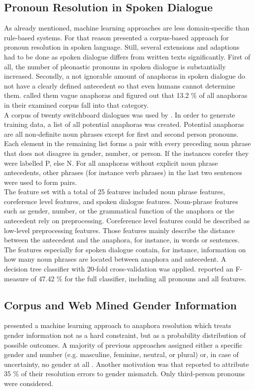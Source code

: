 \subsection{Pronoun Resolution in Spoken Dialogue}
As already mentioned, machine learning approaches are less domain-specific than rule-based systems. For that reason \cite{strube2003machine} presented a corpus-based approach for pronoun resolution in spoken language. Still, several extensions and adaptions had to be done as spoken dialogue differs from written texts significantly. First of all, the number of pleonastic pronouns in spoken dialogue is substantially increased. Secondly, a not ignorable amount of anaphoras in spoken dialogue do not have a clearly defined antecedent so that even humans cannot determine them. \cite{eckert2000dialogue} called them vague anaphoras and figured out that 13.2 \% of all anaphoras in their examined corpus fall into that category.\\
A corpus of twenty switchboard dialogues was used by \cite{strube2003machine}. In order to generate training data, a list of all potential anaphoras was created. Potential anaphoras are all non-definite noun phrases except for first and second person pronouns. Each element in the remaining list forms a pair with every preceding noun phrase that does not disagree in gender, number, or person. If the instances corefer they were labelled P, else N. For all anaphoras without explicit noun phrase antecedents, other phrases (for instance verb phrases) in the last two sentences were used to form pairs. \\
The feature set with a total of 25 features included noun phrase features, coreference level features, and spoken dialogue features. Noun-phrase features such as gender, number, or the grammatical function of the anaphora or the antecedent rely on preprocessing. Coreference level features could be described as low-level preprocessing features. Those features mainly describe the distance between the antecedent and the anaphora, for instance, in words or sentences. The features especially for spoken dialogue contain, for instance, information on how many noun phrases are located between anaphora and antecedent.
A decision tree classifier with 20-fold cross-validation was applied. \citep{strube2003machine} reported an F-measure of 47.42 \% for the full classifier, including all pronouns and all features. 

\subsection{Corpus and Web Mined Gender Information}
\label{section:bergsma2005automatic}
\cite{bergsma2005automatic} presented a machine learning approach to anaphora resolution which treats gender information not as a hard constraint, but as a probability distribution of possible outcomes. A majority of previous approaches assigned either a specific gender and number (e.g. masculine, feminine, neutral, or plural) or, in case of uncertainty, no gender at all \citep{soon2001machine, broscheit2010bart}. Another motivation was that \cite{kennedy1996anaphora} reported to attribute 35 \% of their resolution errors to gender mismatch. Only third-person pronouns were considered.

